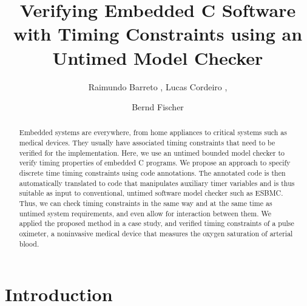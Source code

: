 \documentclass{llncs}
\begin{document}
\lstset{language=C,basicstyle=\small}
\lstset{numbers=left, numberstyle=\tiny, stepnumber=1, numbersep=5pt}
\lstset{firstnumber=1}
\lstset{frame=single}
\lstset{showstringspaces=false}
\lstset{showspaces=false}
\lstset{showtabs=false}
\lstset{tabsize=2}

\newcommand{\newbf}[1]{\textcolor{red}{#1}}
\newcommand{\newrb}[1]{\textcolor{blue}{#1}}
\newcommand{\blurb}[1]{{\texttt{... #1 ...}}}


\title{Verifying Embedded C Software with Timing Constraints using an Untimed Model Checker}
\author{
  Raimundo Barreto ,
  Lucas Cordeiro   , \and 
  Bernd Fischer    
}

\maketitle

\begin{abstract}
Embedded systems are everywhere, from home appliances to critical systems such
as medical devices. They usually have associated timing constraints that need to be
verified for the implementation.  Here, we use an untimed
bounded model checker to verify timing properties of embedded C programs.
We propose an approach to specify discrete time timing constraints using code annotations. The
annotated code is then automatically translated to code that manipulates
auxiliary timer variables and is thus suitable as input to conventional, untimed software
model checker such as ESBMC.  Thus, we can check timing
constraints in the same way and at the same time as untimed system
requirements, and even allow for interaction between them.  We applied the
proposed method in a case study, and verified timing constraints of a pulse
oximeter, a noninvasive medical device that measures the oxygen
saturation of arterial blood.
\end{abstract}


\section{Introduction}
\end{document}
